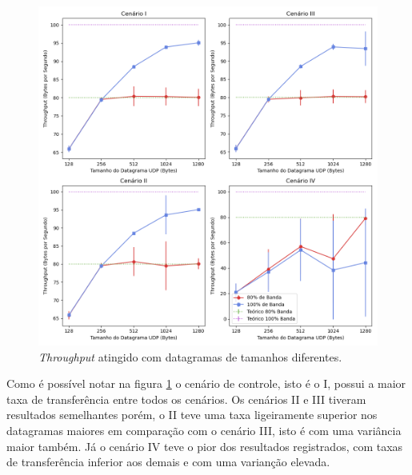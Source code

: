 \begin{figure}[H]
    \centering
    \includegraphics[width=0.9\linewidth]{sources/fig-throughput.png}
		\caption{\textit{Throughput} atingido com datagramas de tamanhos diferentes.}
    \label{fig:throughput}
\end{figure}

Como é possível notar na figura \ref{fig:throughput} o cenário de controle, isto é o I, possui a maior taxa de transferência entre todos os cenários. Os cenários II e III tiveram resultados semelhantes porém, o II teve uma taxa ligeiramente superior nos datagramas maiores em comparação com o cenário III, isto é com uma variância maior também. Já o cenário IV teve o pior dos resultados registrados, com taxas de transferência inferior aos demais e com uma varianção elevada.


